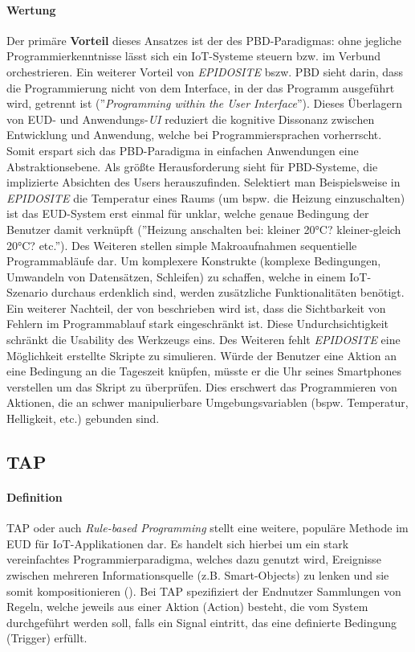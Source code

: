 \paragraph{Wertung} Der primäre \textbf{Vorteil} dieses Ansatzes ist der des \ac{PBD}-Paradigmas: ohne jegliche Programmierkenntnisse lässt sich ein \ac{IoT}-Systeme steuern bzw. im Verbund orchestrieren. Ein weiterer Vorteil von \textit{EPIDOSITE} bszw. \ac{PBD} sieht \cite{cypher1993pbd} darin, dass die Programmierung nicht von dem Interface, in der das Programm ausgeführt wird, getrennt ist (''\textit{Programming within the User Interface}''). Dieses Überlagern von \ac{EUD}- und Anwendungs-\textit{UI} reduziert die kognitive Dissonanz zwischen Entwicklung und Anwendung, welche bei Programmiersprachen vorherrscht. Somit erspart sich das \ac{PBD}-Paradigma in einfachen Anwendungen eine Abstraktionsebene. Als größte Herausforderung sieht \cite{cypher1993pbd} für \ac{PBD}-Systeme, die implizierte Absichten des Users herauszufinden. Selektiert man Beispielsweise in \textit{EPIDOSITE} die Temperatur eines Raums (um bspw. die Heizung einzuschalten) ist das \ac{EUD}-System erst einmal für unklar, welche genaue Bedingung der Benutzer damit verknüpft (''Heizung anschalten bei: kleiner 20°C? kleiner-gleich 20°C? etc.''). Des Weiteren stellen simple Makroaufnahmen sequentielle Programmabläufe dar. Um komplexere Konstrukte (komplexe Bedingungen, Umwandeln von Datensätzen, Schleifen) zu schaffen, welche in einem \ac{IoT}-Szenario durchaus erdenklich sind, werden zusätzliche Funktionalitäten benötigt. Ein weiterer Nachteil, der von \cite{li2017programming} beschrieben wird ist, dass die Sichtbarkeit von Fehlern im Programmablauf stark eingeschränkt ist. Diese Undurchsichtigkeit schränkt die Usability des Werkzeugs eins. Des Weiteren fehlt \textit{EPIDOSITE} eine Möglichkeit erstellte Skripte zu simulieren. Würde der Benutzer eine Aktion an eine Bedingung an die Tageszeit knüpfen, müsste er die Uhr seines Smartphones verstellen um das Skript zu überprüfen. Dies erschwert das Programmieren von Aktionen, die an schwer manipulierbare Umgebungsvariablen (bspw. Temperatur, Helligkeit, etc.) gebunden sind.

\subsection{\acl{TAP}}

\paragraph{Definition} \ac{TAP} oder auch \textit{Rule-based Programming} stellt eine weitere, populäre Methode im \ac{EUD} für \ac{IoT}-Applikationen dar. Es handelt sich hierbei um ein stark vereinfachtes Programmierparadigma, welches dazu genutzt wird, Ereignisse zwischen mehreren Informationsquelle (z.B. Smart-Objects) zu lenken und sie somit kompositionieren (\cite{ur2014practical}). Bei \ac{TAP} spezifiziert der Endnutzer Sammlungen von Regeln, welche jeweils aus einer Aktion (Action) besteht, die vom System durchgeführt werden soll, falls ein Signal eintritt, das eine definierte Bedingung (Trigger) erfüllt. 

